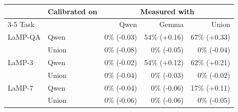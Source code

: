 \begin{tabular}{llrrr}
\toprule
 & Calibrated on & \multicolumn{3}{c}{Measured with} \\
\cmidrule(lr){3-5}
Task & & Qwen & Gemma & Union \\
\midrule
LaMP-QA & Qwen & 0\% (-0.03) & 54\% (+0.16) & 67\% (+0.33) \\
 & Union & 0\% (-0.08) & 0\% (-0.05) & 0\% (-0.04) \\
LaMP-3 & Qwen & 0\% (-0.02) & 54\% (+0.12) & 62\% (+0.21) \\
 & Union & 0\% (-0.04) & 0\% (-0.03) & 0\% (-0.02) \\
LaMP-7 & Qwen & 0\% (-0.04) & 0\% (-0.06) & 17\% (+0.11) \\
 & Union & 0\% (-0.06) & 0\% (-0.06) & 0\% (-0.05) \\
\bottomrule
\end{tabular}
